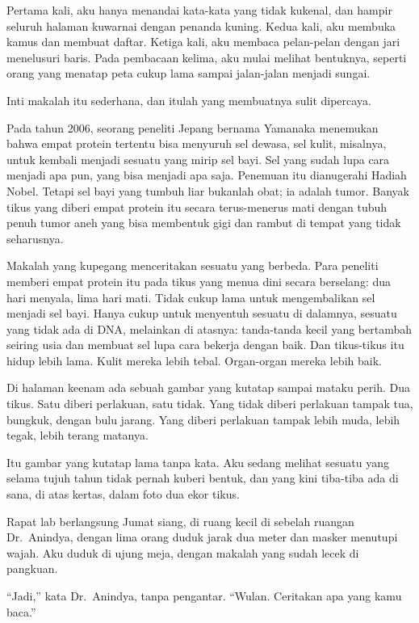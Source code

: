 \documentclass[11pt,twoside,openany]{book}
\makeatletter
\newcommand{\scenebreak}{\par\vspace{0.9em}{\centering\textsc{*\hspace{0.7em}*\hspace{0.7em}*}\par}\vspace{0.9em}\@afterindentfalse\@afterheading}
\makeatother
\begin{document}
Pertama kali, aku hanya menandai kata-kata yang tidak kukenal, dan hampir seluruh halaman kuwarnai dengan penanda kuning. Kedua kali, aku membuka kamus dan membuat daftar. Ketiga kali, aku membaca pelan-pelan dengan jari menelusuri baris. Pada pembacaan kelima, aku mulai melihat bentuknya, seperti orang yang menatap peta cukup lama sampai jalan-jalan menjadi sungai.

Inti makalah itu sederhana, dan itulah yang membuatnya sulit dipercaya.

Pada tahun 2006, seorang peneliti Jepang bernama Yamanaka menemukan bahwa empat protein tertentu bisa menyuruh sel dewasa, sel kulit, misalnya, untuk kembali menjadi sesuatu yang mirip sel bayi. Sel yang sudah lupa cara menjadi apa pun, yang bisa menjadi apa saja. Penemuan itu dianugerahi Hadiah Nobel. Tetapi sel bayi yang tumbuh liar bukanlah obat; ia adalah tumor. Banyak tikus yang diberi empat protein itu secara terus-menerus mati dengan tubuh penuh tumor aneh yang bisa membentuk gigi dan rambut di tempat yang tidak seharusnya.

Makalah yang kupegang menceritakan sesuatu yang berbeda. Para peneliti memberi empat protein itu pada tikus yang menua dini secara berselang: dua hari menyala, lima hari mati. Tidak cukup lama untuk mengembalikan sel menjadi sel bayi. Hanya cukup untuk menyentuh sesuatu di dalamnya, sesuatu yang tidak ada di DNA, melainkan di atasnya: tanda-tanda kecil yang bertambah seiring usia dan membuat sel lupa cara bekerja dengan baik. Dan tikus-tikus itu hidup lebih lama. Kulit mereka lebih tebal. Organ-organ mereka lebih baik.

Di halaman keenam ada sebuah gambar yang kutatap sampai mataku perih. Dua tikus. Satu diberi perlakuan, satu tidak. Yang tidak diberi perlakuan tampak tua, bungkuk, dengan bulu jarang. Yang diberi perlakuan tampak lebih muda, lebih tegak, lebih terang matanya.

Itu gambar yang kutatap lama tanpa kata. Aku sedang melihat sesuatu yang selama tujuh tahun tidak pernah kuberi bentuk, dan yang kini tiba-tiba ada di sana, di atas kertas, dalam foto dua ekor tikus.

\scenebreak
Rapat lab berlangsung Jumat siang, di ruang kecil di sebelah ruangan Dr.~Anindya, dengan lima orang duduk jarak dua meter dan masker menutupi wajah. Aku duduk di ujung meja, dengan makalah yang sudah lecek di pangkuan.

``Jadi,'' kata Dr.~Anindya, tanpa pengantar. ``Wulan. Ceritakan apa yang kamu baca.''
\end{document}
